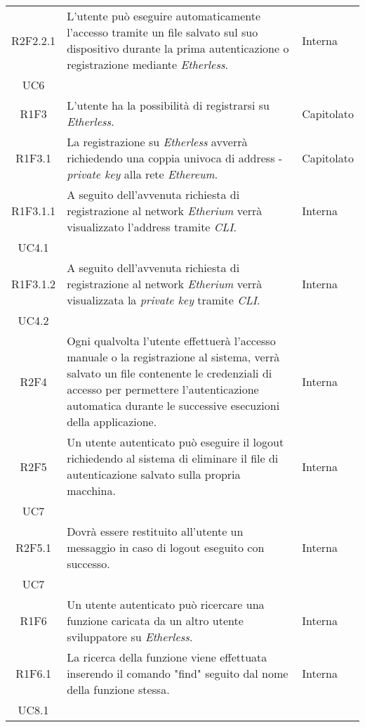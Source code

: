 \begin{longtable}{|c|p{8cm}|C{2cm}|}
	R2F2.2.1 &  L'utente può eseguire automaticamente l'accesso tramite un file salvato sul suo dispositivo durante la prima autenticazione o registrazione mediante \textit{Etherless}.  & \centering Interna \\ UC6 \tabularnewline
	
	R1F3 &  L'utente ha la possibilità di registrarsi su \textit{Etherless}.  & Capitolato \\

	R1F3.1 &  La registrazione su \textit{Etherless} avverrà richiedendo una coppia univoca di address - \textit{private key\glo} alla rete \textit{Ethereum\glos}.  & Capitolato \\
	
	R1F3.1.1 &  A seguito dell'avvenuta richiesta di registrazione al network \textit{Etherium\glo} verrà visualizzato l'address tramite \textit{CLI\glos}.  & \centering Interna \\ UC4.1 \tabularnewline	
	
	R1F3.1.2 &  A seguito dell'avvenuta richiesta di registrazione al network \textit{Etherium\glo} verrà visualizzata la \textit{private key\glo} tramite \textit{CLI\glos}.  & \centering Interna \\ UC4.2 \tabularnewline	
	
	R2F4 &  Ogni qualvolta l'utente effettuerà l'accesso manuale o la registrazione al sistema, verrà salvato un file contenente le credenziali di accesso per permettere l'autenticazione automatica durante le successive esecuzioni della applicazione.  & Interna \\
	
	R2F5 &  Un utente autenticato può eseguire il logout richiedendo al sistema di eliminare il file di autenticazione salvato sulla propria macchina.  & \centering Interna \\ UC7 \tabularnewline
	
	R2F5.1 &  Dovrà essere restituito all'utente un messaggio in caso di logout eseguito con successo.  & \centering Interna \\ UC7 \tabularnewline
	
	R1F6 &  Un utente autenticato può ricercare una funzione caricata da un altro utente sviluppatore su \textit{Etherless}.  & Interna \\
	
	R1F6.1 &  La ricerca della funzione viene effettuata inserendo il comando "find" seguito dal nome della funzione stessa. & \centering Interna \\ UC8.1 \tabularnewline
	

\end{longtable}
